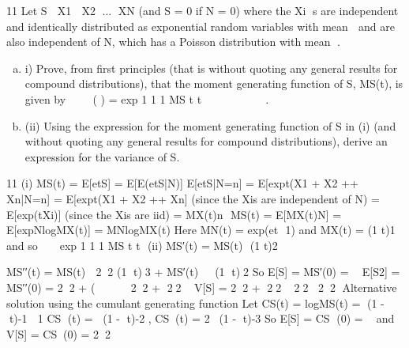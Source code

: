 \documentclass[a4paper,12pt]{article}
\begin{document}
 11 Let S  X1  X2 ... XN (and S = 0 if N = 0) where the Xi s are independent and
identically distributed as exponential random variables with mean  and are also
independent of N, which has a Poisson distribution with mean .
\begin{enumerate}[(a)]
    \item i) Prove, from first principles (that is without quoting any general results for
compound distributions), that the moment generating function of S, MS(t), is
given by    ( ) = exp 1 1 1 MS t t        	
. 
\item (ii) Using the expression for the moment generating function of S in (i) (and
without quoting any general results for compound distributions), derive an
expression for the variance of S. 
\end{enumerate}

\newpage
11 (i) MS(t) = E[etS] = E[E(etS|N)]
E[etS|N=n] = E[exp{t(X1 + X2 ++ Xn}|N=n]
= E[exp{t(X1 + X2 ++ Xn}] (since the Xis are independent of N)
= 
 E[exp(tXi)] (since the Xis are iid)
= {MX(t)}n
 MS(t) = E[{MX(t)}N] = E[exp{NlogMX(t)}] = MN{logMX(t)}
Here MN(t) = exp{(et  1)} and MX(t) = (1 	t)1 and so
     exp 1 1 1 MS t t       	 
(ii) MS′(t) = MS(t)  (1 	 t)2

MS′′(t) = MS(t)  22 (1 	 t)3 + MS′(t)  (1 	 t)2
So E[S] = MS′(0) = 
E[S2] = MS′′(0) = 22 + (  
22 + 22
V[S] = 22 + 22	22
22
Alternative solution using the cumulant generating function
Let CS(t) = logMS(t) = {(1 - t)-1  1}
CS (t) = (1 - t)-2 , CS(t) = 2(1 - t)-3
So E[S] = CS (0) =  and V[S] = CS(0) = 22
\end{document}
